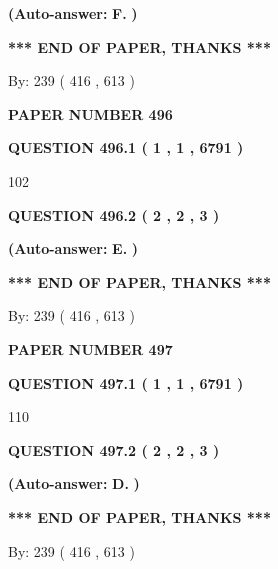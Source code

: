 \documentclass[12pt]{article}
\begin{document}
 
{\textbf{(Auto-answer:}}
{\textbf{\large{
F.}}}
{\textbf{)}}
 
 
   
   
   
   
\vspace{1.0in} 
{\textbf{\large{ *** END OF PAPER, THANKS *** }}} 
   
   
\hspace{1.0in} By: 
 239 ( 416 ,  613 )
   
   
   
   
\newpage 
\setcounter{page}{ 
   496001 } 
   
   
 {\textbf{ \Large{ PAPER NUMBER  496  }}}
   
   
   
   
  
  
{\textbf{\large{QUESTION
496.1 
 ( 1 , 1 , 6791 )
}}}

102
  
  
{\textbf{\large{QUESTION
496.2 
 ( 2 , 2 , 3 )
}}}
 
 
{\textbf{(Auto-answer:}}
{\textbf{\large{
E.}}}
{\textbf{)}}
 
 
   
   
   
   
\vspace{1.0in} 
{\textbf{\large{ *** END OF PAPER, THANKS *** }}} 
   
   
\hspace{1.0in} By: 
 239 ( 416 ,  613 )
   
   
   
   
\newpage 
\setcounter{page}{ 
   497001 } 
   
   
 {\textbf{ \Large{ PAPER NUMBER  497  }}}
   
   
   
   
  
  
{\textbf{\large{QUESTION
497.1 
 ( 1 , 1 , 6791 )
}}}

110
  
  
{\textbf{\large{QUESTION
497.2 
 ( 2 , 2 , 3 )
}}}
 
 
{\textbf{(Auto-answer:}}
{\textbf{\large{
D.}}}
{\textbf{)}}
 
 
   
   
   
   
\vspace{1.0in} 
{\textbf{\large{ *** END OF PAPER, THANKS *** }}} 
   
   
\hspace{1.0in} By: 
 239 ( 416 ,  613 )
   
   
   
\end{document}
